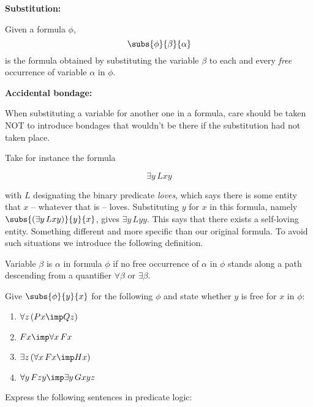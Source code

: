 \documentclass[11pt]{article}
\begin{document}
{\item[] {\bf Substitution:}

\item Given a formula $\phi$, 
$$\subs{\phi}{\beta}{\alpha}$$ 
is the formula obtained by substituting the variable $\beta$ to each and every
\emph{free} occurrence of variable $\alpha$ in $\phi$.


\item[] {\bf Accidental bondage:}

\item When substituting a variable for another one in a formula, care should be
taken NOT to introduce bondages that wouldn't be there if the substitution had
not taken place.  
\item[] Take for instance the formula

$$\exists y\, Lxy$$

with $L$ designating the binary predicate \emph{loves}, which says there is some
entity that $x$ -- whatever that is -- loves. Substituting $y$ for $x$ in this
formula, namely $\subs{(\exists y\, Lxy)}{y}{x}$, gives $\exists y\, Lyy$. This
says that there exists a self-loving entity. Something different and more
specific than our original formula. To avoid such situations we introduce the
following definition.

\item Variable $\beta$ is  $\alpha$ in formula $\phi$ if no free
occurrence of $\alpha$ in $\phi$ stands along a path descending from a
quantifier $\forall \beta$  or $\exists \beta$.

\begin{uexercise}
Give $\subs{\phi}{y}{x}$ for the following $\phi$ and state whether $y$ is free
for $x$ in $\phi$:

\begin{enumerate}
\item $\forall z\,(Px\imp Qz)$
\item $Fx \imp \forall x\, Fx$
\item $\exists z\,(\forall x\, Fx \imp Hx)$
\item $\forall y\,Fzy\imp \exists y\, Gxyz$
\end{enumerate}
\end{uexercise}

\begin{uexercise}
Express the following sentences in predicate logic:
\end{uexercise}
}
\end{document}
